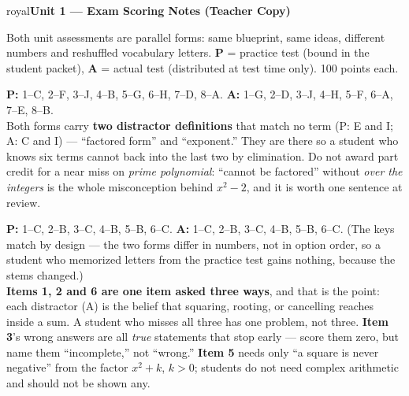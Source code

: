 \documentclass[10pt]{article}
\begin{document}


\newpage

\begin{headlinebox}{royal}{\color{white}\bfseries Unit 1 --- Exam Scoring Notes (Teacher Copy)}\end{headlinebox}

\vspace{4pt}
\noindent\footnotesize
Both unit assessments are parallel forms: same blueprint, same ideas, different numbers and
reshuffled vocabulary letters. \textbf{P} = practice test (bound in the student packet),
\textbf{A} = actual test (distributed at test time only). 100 points each.

\vspace{4pt}

\boxguard[10]
\begin{teachernote}
\footnotesize
\textbf{P:} 1--C, 2--F, 3--J, 4--B, 5--G, 6--H, 7--D, 8--A. \qquad
\textbf{A:} 1--G, 2--D, 3--J, 4--H, 5--F, 6--A, 7--E, 8--B.\\[2pt]
Both forms carry \textbf{two distractor definitions} that match no term (P: E and I; A: C and I) ---
``factored form'' and ``exponent.'' They are there so a student who knows six terms cannot
back into the last two by elimination. Do not award part credit for a near miss on
\emph{prime polynomial}: ``cannot be factored'' without \emph{over the integers} is the whole
misconception behind $x^2-2$, and it is worth one sentence at review.
\end{teachernote}

\boxguard[10]
\begin{teachernote}
\footnotesize
\textbf{P:} 1--C, 2--B, 3--C, 4--B, 5--B, 6--C. \qquad \textbf{A:} 1--C, 2--B, 3--C, 4--B, 5--B, 6--C.
(The keys match by design --- the two forms differ in numbers, not in option order, so a
student who memorized letters from the practice test gains nothing, because the stems changed.)\\[2pt]
\textbf{Items 1, 2 and 6 are one item asked three ways}, and that is the point: each distractor
(A) is the belief that squaring, rooting, or cancelling reaches inside a sum. A student who
misses all three has one problem, not three. \textbf{Item 3}'s wrong answers are all \emph{true}
statements that stop early --- score them zero, but name them ``incomplete,'' not ``wrong.''
\textbf{Item 5} needs only ``a square is never negative'' from the factor $x^2+k$, $k>0$; students
do not need complex arithmetic and should not be shown any.
\end{teachernote}
\end{document}
